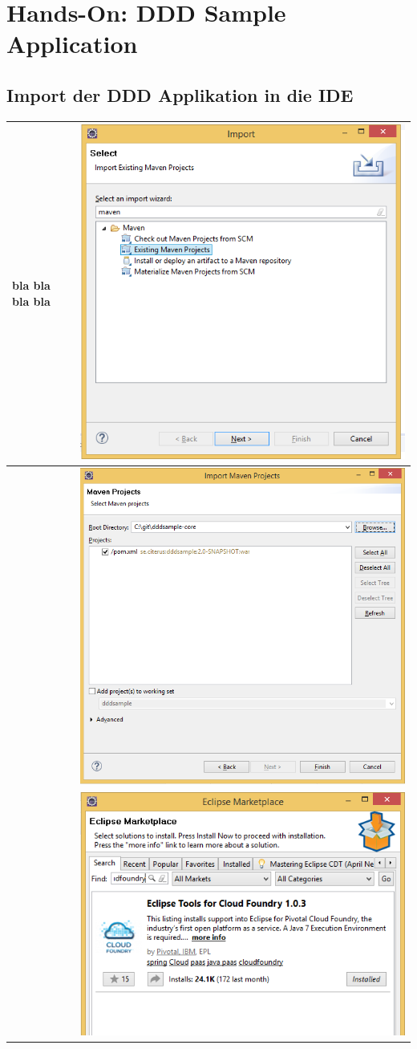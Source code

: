 \chapter{Hands-On: DDD Sample Application}
\section{Import der DDD Applikation in die IDE}
\begin{longtable}{| p{5cm} | p{11cm} |}
\hline
bla bla bla bla
&\includegraphics[width=0.65\columnwidth, valign=T]{images/ddd_basic/1.png}
 \\ \hline
&\includegraphics[width=0.65\columnwidth, valign=T]{images/ddd_basic/2.png}
 \\ \hline
&\includegraphics[width=0.65\columnwidth, valign=T]{images/ddd_basic/3.png}
 \\ \hline 
\end{longtable}
\newpage
